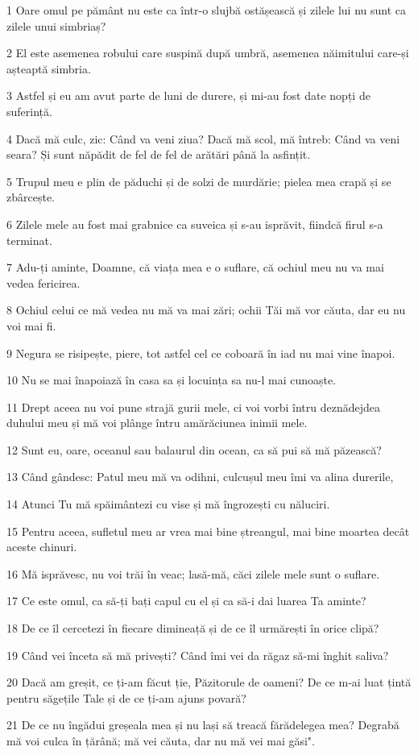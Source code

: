 \par 1 Oare omul pe pământ nu este ca într-o slujbă ostășească și zilele lui nu sunt ca zilele unui simbriaș?
\par 2 El este asemenea robului care suspină după umbră, asemenea năimitului care-și așteaptă simbria.
\par 3 Astfel și eu am avut parte de luni de durere, și mi-au fost date nopți de suferință.
\par 4 Dacă mă culc, zic: Când va veni ziua? Dacă mă scol, mă întreb: Când va veni seara? Și sunt năpădit de fel de fel de arătări până la asfințit.
\par 5 Trupul meu e plin de păduchi și de solzi de murdărie; pielea mea crapă și se zbârcește.
\par 6 Zilele mele au fost mai grabnice ca suveica și s-au isprăvit, fiindcă firul s-a terminat.
\par 7 Adu-ți aminte, Doamne, că viața mea e o suflare, că ochiul meu nu va mai vedea fericirea.
\par 8 Ochiul celui ce mă vedea nu mă va mai zări; ochii Tăi mă vor căuta, dar eu nu voi mai fi.
\par 9 Negura se risipește, piere, tot astfel cel ce coboară în iad nu mai vine înapoi.
\par 10 Nu se mai înapoiază în casa sa și locuința sa nu-l mai cunoaște.
\par 11 Drept aceea nu voi pune strajă gurii mele, ci voi vorbi întru deznădejdea duhului meu și mă voi plânge întru amărăciunea inimii mele.
\par 12 Sunt eu, oare, oceanul sau balaurul din ocean, ca să pui să mă păzească?
\par 13 Când gândesc: Patul meu mă va odihni, culcușul meu îmi va alina durerile,
\par 14 Atunci Tu mă spăimântezi cu vise și mă îngrozești cu năluciri.
\par 15 Pentru aceea, sufletul meu ar vrea mai bine ștreangul, mai bine moartea decât aceste chinuri.
\par 16 Mă isprăvesc, nu voi trăi în veac; lasă-mă, căci zilele mele sunt o suflare.
\par 17 Ce este omul, ca să-ți bați capul cu el și ca să-i dai luarea Ta aminte?
\par 18 De ce îl cercetezi în fiecare dimineață și de ce îl urmărești în orice clipă?
\par 19 Când vei înceta să mă privești? Când îmi vei da răgaz să-mi înghit saliva?
\par 20 Dacă am greșit, ce ți-am făcut ție, Păzitorule de oameni? De ce m-ai luat țintă pentru săgețile Tale și de ce ți-am ajuns povară?
\par 21 De ce nu îngădui greșeala mea și nu lași să treacă fărădelegea mea? Degrabă mă voi culca în țărână; mă vei căuta, dar nu mă vei mai găsi".

